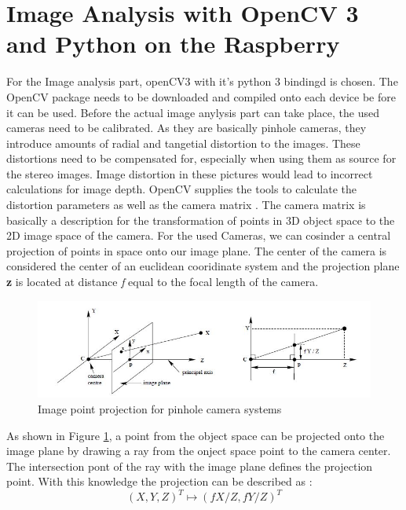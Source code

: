 \section{Image Analysis with OpenCV 3 and Python on the Raspberry}
For the Image analysis part, openCV3 with it's python 3 bindingd is chosen. The OpenCV package needs to be downloaded and compiled onto each device be fore it can be used.
Before the actual image anylysis part can take place, the used cameras need to be calibrated. As they are basically pinhole cameras, they introduce amounts of radial and tangetial distortion to the images. These distortions need to be compensated for, especially when using them as source for the stereo images. Image distortion in these pictures would lead to incorrect calculations for image depth.
OpenCV supplies the tools to calculate the distortion parameters as well as the camera matrix \cite{Opencv.2018}.
The camera matrix is basically a description for the transformation of points in 3D object space to the 2D image space of the camera. For the used Cameras, we can cosinder a central projection of points in space onto our image plane. The center of the camera is considered the center of an euclidean cooridinate system and the projection plane \textbf{z} is located at distance \textit{f} equal to the focal length of the camera.\\
\begin{figure}[H]
\includegraphics[width=\textwidth]{images/pionhole.JPG}
\caption{Image point projection for pinhole camera systems\cite{Hartley.2000}}
\label{pinholecamera_mapping} 
\end{figure}
As shown in Figure \ref{pinholecamera_mapping}, a point from the object space can be projected onto the image plane by drawing a ray from the onject space point to the camera center. The intersection pont of the ray with the image plane defines the projection point. With this knowledge the projection can be described as :
\begin{equation}
(X,Y,Z)^{T} \mapsto (fX/Z,fY/Z)^{T}
\end{equation}

